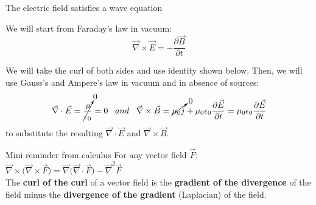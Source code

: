 \begin{frame}{The electric field satisfies a wave equation}

We will start from Faraday's law in vacuum:
\begin{equation*}
  \vec{\nabla} \times \vec{E} = -\frac{\partial \vec{B}}{\partial t}
\end{equation*}

We will take the curl of both sides and use identity shown below.
Then, we will use Gauss's and Ampere's law in vacuum and in absence of sources:
\begin{equation*}
  \vec{\nabla} \cdot \vec{E} =
       \cancelto{0}{\frac{\rho}{\epsilon_0}} = 0
  \;\;\; and \;\;\;
  \vec{\nabla} \times \vec{B} =
        \cancelto{0}{\mu_0 \vec{j}} + \mu_0 \epsilon_0 \frac{\partial \vec{E}}{\partial t} =
        \mu_0 \epsilon_0 \frac{\partial \vec{E}}{\partial t}
\end{equation*}
to substitute the resulting $\vec{\nabla} \cdot \vec{E}$  and $\vec{\nabla} \times \vec{B}$.

\begin{blockminirem}{\small Mini reminder from calculus}
{\small
For any vector field $\vec{F}$:
$\displaystyle \vec{\nabla} \times \Big( \vec{\nabla} \times \vec{F} \Big) =
  \vec{\nabla} \Big( \vec{\nabla} \cdot \vec{F} \Big) - \vec{\nabla}^{2} \vec{F}$\\
\vspace{0.1cm}
The {\bf curl of the curl} of a vector field is
the {\bf gradient of the divergence} of the field minus
the {\bf divergence of the gradient} (Laplacian) of the field.\\
}
\end{blockminirem}

\end{frame}

%
%
%
%

